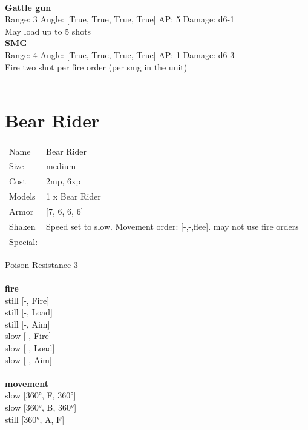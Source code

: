 \ \\
{\bf Gattle gun } \\



Range: 3  Angle: [True, True, True, True] AP: 5 Damage: d6-1 \\
May load up to 5 shots\\ 




{\bf SMG } \\



Range: 4  Angle: [True, True, True, True] AP: 1 Damage: d6-3 \\
Fire two shot per fire order (per smg in the unit)\\ 




 
\ \\













\clearpage

\section{ Bear Rider }

\begin{tabular}{ll}
  Name & Bear Rider \\
  Size & medium\\
  Cost & 2mp, 6xp\\
  Models & 1 x Bear Rider\\
  Armor & [7, 6, 6, 6]\\
  Shaken & Speed set to slow. Movement order: [-,-,flee]. may not use fire orders\\
  Special: \\
\end{tabular}

\noindent Poison Resistance 3\\ 


\ \\ {\bf fire } \\
still [-, Fire] \\
still [-, Load] \\
still [-, Aim] \\
slow [-, Fire] \\
slow [-, Load] \\
slow [-, Aim] \\
\ \\ {\bf movement } \\
slow [360°, F, 360°] \\
slow [360°, B, 360°] \\
still [360°, A, F] \\



